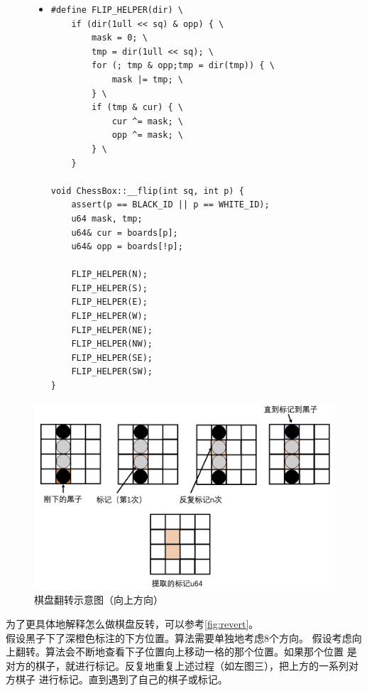 \documentclass[a4paper]{article}
\begin{document}
\begin{figure}[!hbt]
\begin{itemize}
\item[] \begin{lstlisting}[style=mycpp, label=lst:reverte, caption=二进制棋盘的翻转实现]
#define FLIP_HELPER(dir) \
    if (dir(1ull << sq) & opp) { \
        mask = 0; \
        tmp = dir(1ull << sq); \
        for (; tmp & opp;tmp = dir(tmp)) { \
            mask |= tmp; \
        } \
        if (tmp & cur) { \
            cur ^= mask; \
            opp ^= mask; \
        } \
    }

void ChessBox::__flip(int sq, int p) {
    assert(p == BLACK_ID || p == WHITE_ID);
    u64 mask, tmp;
    u64& cur = boards[p];
    u64& opp = boards[!p];

    FLIP_HELPER(N);
    FLIP_HELPER(S);
    FLIP_HELPER(E);
    FLIP_HELPER(W);
    FLIP_HELPER(NE);
    FLIP_HELPER(NW);
    FLIP_HELPER(SE);
    FLIP_HELPER(SW);
}
\end{lstlisting}
\end{itemize}
\end{figure}

\begin{figure}[!hbt]
    \begin{center}
    \includegraphics[scale=0.4]{assets/revert.png}
    \caption{棋盘翻转示意图（向上方向）\label{fig:revert}} 
    \end{center} 
\end{figure} 
为了更具体地解释怎么做棋盘反转，可以参考\autoref{fig:revert}。\\

假设黑子下了深橙色标注的下方位置。算法需要单独地考虑8个方向。
假设考虑向上翻转。算法会不断地查看下子位置向上移动一格的那个位置。如果那个位置
是对方的棋子，就进行标记。反复地重复上述过程（如左图三），把上方的一系列对方棋子
进行标记。直到遇到了自己的棋子或标记。\\
\end{document}

